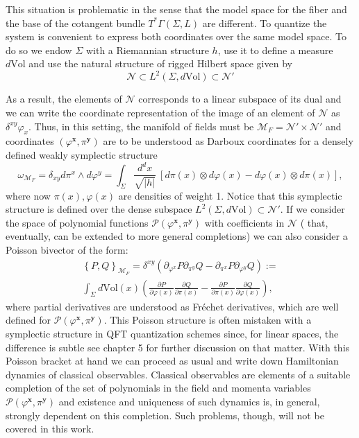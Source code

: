 \documentclass[12pt]{article}%
\begin{document}
This situation is problematic in the sense that the model space for the fiber and the base of the cotangent bundle $T^*\Gamma(\Sigma,L)$ are different. To quantize the system is convenient to express both coordinates over the same model space. To do so we endow $\Sigma$ with a Riemannian structure $h$, use it to define a measure $d\mathrm{Vol}$ and use the natural structure of rigged Hilbert space given by 
\begin{equation}
\label{eq:rhsOnSigma}
\mathcal{N}\subset L^2(\Sigma,d\textrm{Vol})\subset \mathcal{N}'
\end{equation} 

As a result, the elements of $\mathcal{N}$ corresponds to a linear subspace of its dual and we can write the coordinate representation of the image of an element of $\mathcal{N}$ as $\delta^{xy}\varphi_x$. Thus, in this setting, the manifold of fields must  be $\mathcal{M}_F=\mathcal{N}'\times \mathcal{N}'$ and coordinates $(\varphi^\mathbf{x},\pi^\mathbf{y})$ are to be understood as Darboux coordinates for a densely defined weakly symplectic structure
\begin{equation}
\label{eq:symplecticFormlifted}
\omega_{\mathcal{M}_F}=\delta_{xy} d\pi^x \wedge d\varphi^y =\int_\Sigma \frac{d^dx}{\sqrt{\lvert h\rvert}}\ [d\pi(x)\otimes d\varphi(x)-d\varphi(x)\otimes d\pi(x)],
\end{equation}
where now $\pi(x),\varphi(x)$ are densities of weight 1. Notice that this symplectic structure is defined over the dense subspace $L^2(\Sigma,d\textrm{Vol})\subset \mathcal{N}'$. If we consider the space of polynomial functions  $\mathcal{P}(\varphi^\mathbf{x},\pi^\mathbf{y})$ with coefficients in $\mathcal{N}$ ( that, eventually, can be  extended to more general completions) we can also consider a Poisson bivector of the form:
\begin{multline}
\label{eq:poissonbracket}
\left\{P,Q\right\}_{\mathcal{M}_F}=
\delta^{xy}\left( \partial_{\varphi^x}P\partial_{\pi^y}Q-\partial_{\pi^x}P\partial_{\varphi^y}Q \right):=\\
\int_\Sigma d\textrm{Vol}(x)\left( \frac{\partial P}{\partial\varphi(x)}\frac{\partial Q}{\partial\pi(x)}-\frac{\partial P}{\partial\pi(x)}\frac{\partial Q}{\partial\varphi(x)} \right),
\end{multline}
where partial derivatives are understood as Fréchet derivatives, which are well defined for $\mathcal{P}(\varphi^\mathbf{x},\pi^\mathbf{y})$. This Poisson structure is often mistaken with a symplectic structure in QFT quantization schemes since, for linear spaces, the difference is subtle see \cite{Brunetti2015} chapter 5 for further discussion on that matter. With this Poisson bracket at hand we can proceed as usual and write down Hamiltonian dynamics of classical observables.  Classical observables are elements of a suitable completion of the set of polynomials in the field and momenta variables $\mathcal{P}(\varphi^\mathbf{x},\pi^\mathbf{y})$ and existence and uniqueness of such dynamics is, in general, strongly dependent on this completion.   Such problems, though, will not be covered in this work.
\end{document}
